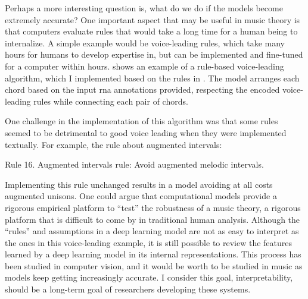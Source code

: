 

Perhaps a more interesting question is, what do we do if the
models become extremely accurate? One important aspect that
may be useful in music theory is that computers evaluate
rules that would take a long time for a human being to
internalize. A simple example would be voice-leading rules,
which take many hours for humans to develop expertise in,
but can be implemented and fine-tuned for a computer within
hours.  shows an example of a
rule-based voice-leading algorithm, which I implemented
based on the rules in
\textcite[p.~10]{huron2016voice}.
The model arranges each chord based on the input \gls{rna}
annotations provided, respecting the encoded voice-leading
rules while connecting each pair of chords. 


One challenge in the implementation of this algorithm was
that some rules seemed to be detrimental to good voice
leading when they were implemented textually. For example,
the rule about augmented intervals:

\begin{italicquotes}
    Rule 16. Augmented intervals rule: Avoid augmented
    melodic intervals.
\end{italicquotes}

Implementing this rule unchanged results in a model avoiding
at all costs augmented unisons. One could argue that
computational models provide a rigorous empirical platform
to ``test'' the robustness of a music theory, a rigorous
platform that is difficult to come by in traditional human
analysis. Although the ``rules'' and assumptions in a deep
learning model are not as easy to interpret as the ones in
this voice-leading example, it is still possible to review
the features learned by a deep learning model in its
internal representations. This process has been studied in
computer vision, and it would be worth to be studied in
music as models keep getting increasingly accurate. I
consider this goal, interpretability, should be a long-term
goal of researchers developing these systems.
